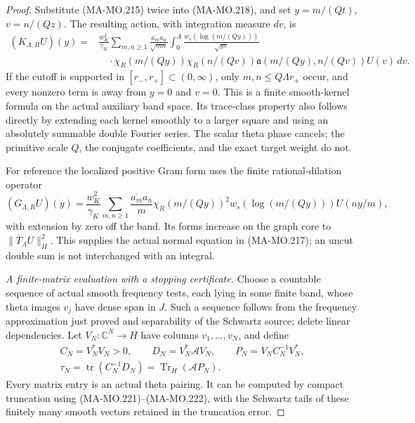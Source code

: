\begin{proof}
Substitute (MA-MO.215) twice into (MA-MO.218), and set
\(y=m/(Qt)\), \(v=n/(Qz)\).  The resulting action, with
integration measure \(dv\), is
\[
 \begin{aligned}
 (K_{\Lambda,R}U)(y)
  ={}&\frac{w_K^2}{\gamma_K}
       \sum_{m,n\ge1}\frac{\overline{a_m}a_n}{\sqrt{mn}}
       \int_0^\Lambda
       \frac{w_s(\log(m/(Qy)))}{\sqrt{yv}}\\
     &\quad\cdot\chi_R(m/(Qy))\chi_R(n/(Qv))
       \mathfrak a(m/(Qy),n/(Qv))U(v)\,dv .
 \end{aligned}
 \tag{MA-MO.221}
\]
If the cutoff is supported in \([r_-,r_+]\subset(0,\infty)\),
only \(m,n\le Q\Lambda r_+\) occur, and every nonzero
term is away from \(y=0\) and \(v=0\).  This is a finite
smooth-kernel formula on the actual auxiliary band space.
Its trace-class property also follows directly by extending
each kernel smoothly to a larger square and using an
absolutely summable double Fourier series.  The scalar theta
phase cancels; the primitive scale \(Q\), the conjugate
coefficients, and the exact target weight do not.

For reference the localized positive Gram form uses the
finite rational-dilation operator
\[
 (G_{\Lambda,R}U)(y)=\frac{w_K^2}{\gamma_K}
       \sum_{m,n\ge1}\frac{\overline{a_m}a_n}{m}
       \chi_R(m/(Qy))^2w_s(\log(m/(Qy)))U(ny/m),
 \tag{MA-MO.222}
\]
with extension by zero off the band.  Its forms increase
on the graph core to \(\|\overline T_\Lambda U\|_H^2\).
This supplies the actual normal equation in (MA-MO.217);
an uncut double sum is not interchanged with an integral.

\emph{A finite-matrix evaluation with a stopping certificate.}
Choose a countable sequence of actual smooth frequency tests,
each lying in some finite band, whose theta images \(v_j\)
have dense span in \(J\).  Such a sequence follows from the
frequency approximation just proved and separability of the
Schwartz source; delete linear dependencies.  Let
\(V_N:\mathbb C^N\to H\) have columns \(v_1,\ldots,v_N\),
and define
\[
 \begin{gathered}
 C_N=V_N^*V_N>0,\qquad D_N=V_N^*\mathcal A V_N,\qquad
 P_N=V_NC_N^{-1}V_N^*,\\
 \tau_N=\operatorname{tr}(C_N^{-1}D_N)
                   =\operatorname{Tr}_H(\mathcal A P_N).
 \end{gathered}
 \tag{MA-MO.223}
\]
Every matrix entry is an actual theta pairing.  It can be
computed by compact truncation using (MA-MO.221)--(MA-MO.222),
with the Schwartz tails of these finitely many smooth vectors
retained in the truncation error.


\end{proof}
